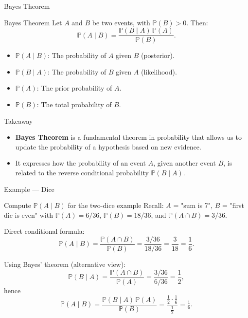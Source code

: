 \documentclass{beamer}
\renewcommand{\P}{\mathbb{P}}
\newcommand{\1}{\mathbf{1}}
\begin{document}
\begin{frame}{Bayes Theorem}
  \begin{block}{Bayes Theorem}
    Let \( A \) and \( B \) be two events, with \( \P(B) > 0 \). Then:
    \[
      \P(A\mid B) = \frac{\P(B\mid A) \, \P(A)}{\P(B)}.
    \]
  \end{block}

  \begin{itemize}
      \small
    \item \( \P(A\mid B) \): The probability of \( A \) given \( B \) (posterior).
    \item \( \P(B\mid A) \): The probability of \( B \) given \( A \) (likelihood).
    \item \( \P(A) \): The prior probability of \( A \).
    \item \( \P(B) \): The total probability of \( B \).
  \end{itemize}
  \begin{exampleblock}{Takeaway}
    \small
    \begin{itemize}
      \item \textbf{Bayes Theorem} is a fundamental theorem in probability that allows us to update the probability of a hypothesis based on new evidence.
      \item It expresses how the probability of an event \( A \), given another event \( B \), is related to the reverse conditional probability \( \P(B\mid A) \).
    \end{itemize}
  \end{exampleblock}
\end{frame}

\begin{frame}{Example — Dice}
  \begin{exampleblock}{Compute $\P(A\mid B)$ for the two-dice example}
    \small
    Recall: $A$ = "sum is 7", $B$ = "first die is even" with
    $\P(A)=6/36$, $\P(B)=18/36$, and $\P(A\cap B)=3/36$.

    Direct conditional formula:
    \[
      \P(A\mid B)=\frac{\P(A\cap B)}{\P(B)}=\frac{3/36}{18/36}=\frac{3}{18}=\frac{1}{6}.
    \]

    Using Bayes' theorem (alternative view):
    \[
      \P(B\mid A)=\frac{\P(A\cap B)}{\P(A)}=\frac{3/36}{6/36}=\frac{1}{2},
    \]
    hence
    \[
      \P(A\mid B)=\frac{\P(B\mid A)\,\P(A)}{\P(B)}=\frac{\tfrac{1}{2}\cdot\tfrac{1}{6}}{\tfrac{1}{2}}=\tfrac{1}{6}.
    \]
  \end{exampleblock}
\end{frame}
\end{document}
